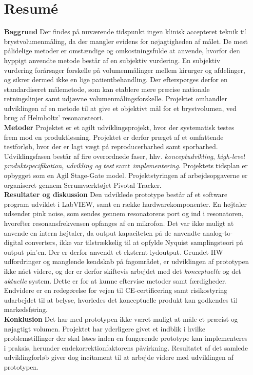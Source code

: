 \section{Resumé}

\textbf{Baggrund} Der findes på nuværende tidspunkt ingen klinisk accepteret teknik til brystvolumenmåling, da der mangler evidens for nøjagtigheden af målet. De mest pålidelige metoder er omstændige og omkostningsfulde at anvende, hvorfor den hyppigt anvendte metode består af en subjektiv vurdering. En subjektiv vurdering forårsager forskelle på volumenmålinger mellem kirurger og afdelinger, og sikrer dermed ikke en lige patientbehandling. Der efterspørges derfor en standardiseret målemetode, som kan etablere mere præcise nationale retningslinjer samt udjævne volumenmålingsforskelle. Projektet omhandler udviklingen af en metode til at give et objektivt mål for et brystvolumen, ved brug af Helmholtz' resonansteori. \\
\textbf{Metoder} Projektet er et agilt udviklingsprojekt, hvor der systematisk testes frem mod en produktløsning. Projektet er derfor præget af et omfattende testforløb, hvor der er lagt vægt på reproducerbarhed samt sporbarhed. 
Udviklingsfasen består af fire overordnede faser, hhv. \textit{konceptudvikling}, \textit{high-level produktspecifikation}, \textit{udvikling og test} samt \textit{implementering}.
Projektets tidsplan er opbygget som en Agil Stage-Gate model. Projektstyringen af arbejdsopgaverne er organiseret gennem Scrumværktøjet Pivotal Tracker.\\
\textbf{Resultater og diskussion} Den udviklede prototype består af et software program udviklet i LabVIEW, samt en række hardwarekomponenter. En højtaler udsender pink noise, som sendes gennem resonatorens port og ind i resonatoren, hvorefter resonansfrekvensen opfanges af en mikrofon. Det var ikke muligt at anvende en intern højtaler, da output kapaciteten på de anvendte analog-to-digital converters, ikke var tilstrækkelig til at opfylde Nyquist samplingsteori på output-pin'en. Der er derfor anvendt et eksternt lydoutput. Grundet HW-udfordringer og manglende kendskab på fagområdet, er udviklingen af prototypen ikke nået videre, og der er derfor skiftevis arbejdet med det \textit{konceptuelle} og det \textit{aktuelle} system. Dette er for at kunne eftervise metoder samt færdigheder. 
Endvidere er en redegørelse for vejen til CE-certificering samt risikostyring udarbejdet til at belyse, hvorledes det konceptuelle produkt kan godkendes til markedsføring.\\
\textbf{Konklusion} Det har med prototypen ikke været muligt at måle et præcist og nøjagtigt volumen. Projektet har yderligere givet et indblik i hvilke problemstillinger der skal løses inden en fungerende prototype kan implementeres i praksis, herunder endekorrektionfaktorens påvirkning.
Resultatet af det samlede udviklingforløb giver dog incitament til at arbejde videre med udviklingen af prototypen.  